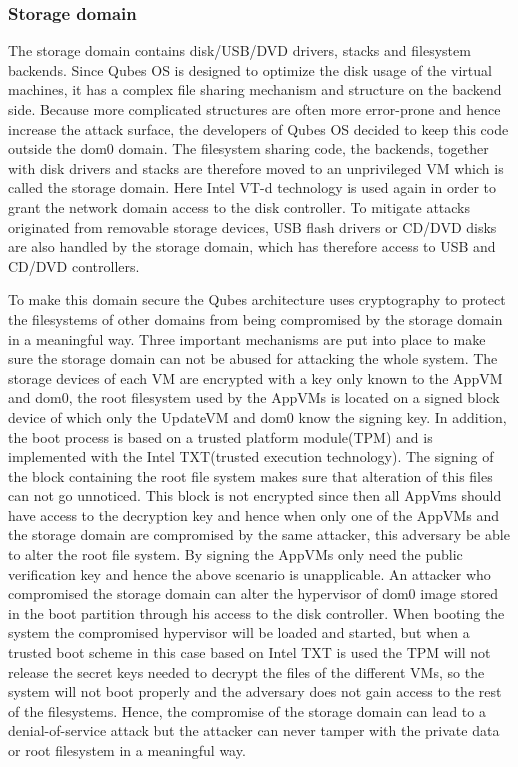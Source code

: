 \documentclass[runningheads,a4paper]{article}
\begin{document}
\subsubsection{Storage domain}

The storage domain contains disk/USB/DVD drivers, stacks and
filesystem backends. Since Qubes OS is designed to optimize the disk
usage of the virtual machines, it has a complex file sharing mechanism
and structure on the backend side. Because more complicated structures
are often more error-prone and hence increase the attack surface, the
developers of Qubes OS decided to keep this code outside the dom0
domain. The filesystem sharing code, the backends, together with disk
drivers and stacks are therefore moved to an unprivileged VM which is
called the storage domain. Here Intel VT-d technology is used again in 
order to grant the network domain access to the disk controller. To
mitigate attacks originated from removable storage devices, USB flash
drivers or CD/DVD disks are also handled by the storage domain, which
has therefore access to USB and CD/DVD controllers.

To make this domain secure the Qubes architecture uses cryptography to
protect the filesystems of other domains from being compromised by the
storage domain in a meaningful way. Three important mechanisms are put
into place to make sure the storage domain can not be abused for
attacking the whole system. The storage devices of each VM are
encrypted with a key only known to the AppVM and dom0, the root
filesystem used by the AppVMs is located on a signed block device of
which only the UpdateVM and dom0 know the signing key. In addition, the boot
process is based on a trusted platform module(TPM) and is implemented
with the Intel TXT(trusted execution technology). The signing of the
block containing the root file system makes sure that alteration of
this files can not go unnoticed. This block is not encrypted since
then all AppVms should have access to the decryption key and hence
when only one of the AppVMs and the storage domain are compromised by
the same attacker, this adversary be able to alter the root file
system. By signing the AppVMs only need the public verification key
and hence the above scenario is unapplicable. An attacker who
compromised the storage domain can alter the hypervisor of dom0 image
stored in the boot partition through his access to the disk
controller. When booting the system the compromised hypervisor will be
loaded and started, but when a trusted boot scheme in this case based
on Intel TXT is used the TPM will not release the secret keys needed
to decrypt the files of the different VMs, so the system will not boot
properly and the adversary does not gain access to the rest of the
filesystems. Hence, the compromise of the storage domain can lead to a
denial-of-service attack but the attacker can never tamper with the
private data or root filesystem in a meaningful way.
\end{document}
